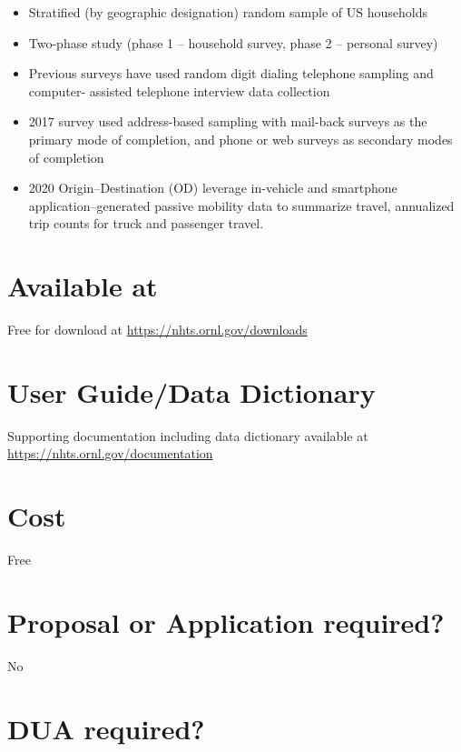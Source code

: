 \documentclass[
]{book}
\providecommand{\tightlist}{%
  \setlength{\itemsep}{0pt}\setlength{\parskip}{0pt}}
\begin{document}
\begin{itemize}
\tightlist
\item
  Stratified (by geographic designation) random sample of US households
\item
  Two-phase study (phase 1 -- household survey, phase 2 -- personal survey)
\item
  Previous surveys have used random digit dialing telephone sampling and computer- assisted telephone interview data collection
\item
  2017 survey used address-based sampling with mail-back surveys as the primary mode of completion, and phone or web surveys as secondary modes of completion
\item
  2020 Origin--Destination (OD) leverage in-vehicle and smartphone application--generated passive mobility data to summarize travel, annualized trip counts for truck and passenger travel.
\end{itemize}

\hypertarget{available-at-52}{%
\section{Available at}\label{available-at-52}}

Free for download at \url{https://nhts.ornl.gov/downloads}

\hypertarget{user-guidedata-dictionary-52}{%
\section{User Guide/Data Dictionary}\label{user-guidedata-dictionary-52}}

Supporting documentation including data dictionary available at \url{https://nhts.ornl.gov/documentation}

\hypertarget{cost-52}{%
\section{Cost}\label{cost-52}}

Free

\hypertarget{proposal-or-application-required-52}{%
\section{Proposal or Application required?}\label{proposal-or-application-required-52}}

No

\hypertarget{dua-required-52}{%
\section{DUA required?}\label{dua-required-52}}
\end{document}
